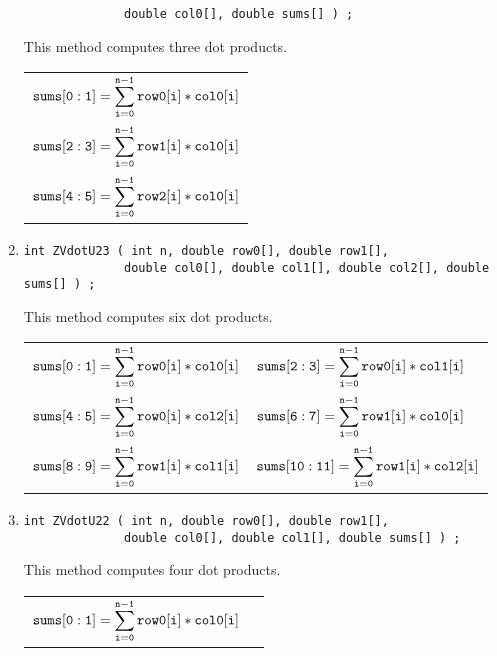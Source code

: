 \begin{enumerate}
\begin{verbatim}
              double col0[], double sums[] ) ;
\end{verbatim}
This method computes three dot products.
\par
\begin{tabular}{l}
$\displaystyle{\tt sums[0:1]}
               = \sum_{\tt i = 0}^{\tt n-1} {\tt row0[i] * col0[i]}$ \\
$\displaystyle{\tt sums[2:3]}
               = \sum_{\tt i = 0}^{\tt n-1} {\tt row1[i] * col0[i]}$ \\
$\displaystyle{\tt sums[4:5]}
               = \sum_{\tt i = 0}^{\tt n-1} {\tt row2[i] * col0[i]}$ 
\end{tabular}
\item
\begin{verbatim}
int ZVdotU23 ( int n, double row0[], double row1[],         
              double col0[], double col1[], double col2[], double sums[] ) ;
\end{verbatim}
This method computes six dot products.
\par
\begin{tabular}{ll}
$\displaystyle{\tt sums[0:1]}
               = \sum_{\tt i = 0}^{\tt n-1} {\tt row0[i] * col0[i]}$ &
$\displaystyle{\tt sums[2:3]}
               = \sum_{\tt i = 0}^{\tt n-1} {\tt row0[i] * col1[i]}$ \\
$\displaystyle{\tt sums[4:5]}
               = \sum_{\tt i = 0}^{\tt n-1} {\tt row0[i] * col2[i]}$ &
$\displaystyle{\tt sums[6:7]}
               = \sum_{\tt i = 0}^{\tt n-1} {\tt row1[i] * col0[i]}$ \\
$\displaystyle{\tt sums[8:9]}
               = \sum_{\tt i = 0}^{\tt n-1} {\tt row1[i] * col1[i]}$ &
$\displaystyle{\tt sums[10:11]}
               = \sum_{\tt i = 0}^{\tt n-1} {\tt row1[i] * col2[i]}$ 
\end{tabular}
\item
\begin{verbatim}
int ZVdotU22 ( int n, double row0[], double row1[], 
              double col0[], double col1[], double sums[] ) ;
\end{verbatim}
This method computes four dot products.
\par
\begin{tabular}{ll}
$\displaystyle{\tt sums[0:1]}
               = \sum_{\tt i = 0}^{\tt n-1} {\tt row0[i] * col0[i]}$ &

\end{tabular}
\end{enumerate}
